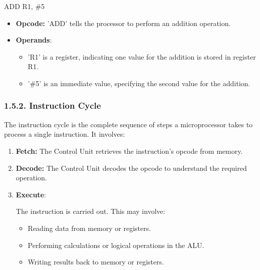 \documentclass[
]{article}
\newenvironment{Shaded}{}{}
\newcommand{\NormalTok}[1]{#1}
\begin{document}
\begin{Shaded}
\begin{Highlighting}[]
\NormalTok{ADD  R1,  \#5}
\end{Highlighting}
\end{Shaded}

\begin{itemize}
\item
  \textbf{Opcode:} 'ADD' tells the processor to perform an addition
  operation.
\item
  \textbf{Operands}:

  \begin{itemize}
  \item
    'R1' is a register, indicating one value for the addition is stored
    in register R1.
  \item
    '\#5' is an immediate value, specifying the second value for the
    addition.
  \end{itemize}
\end{itemize}

\hypertarget{152-instruction-cycle}{%
\subsubsection{1.5.2. Instruction Cycle}\label{152-instruction-cycle}}

The instruction cycle is the complete sequence of steps a microprocessor
takes to process a single instruction. It involves:

\begin{enumerate}
\def\labelenumi{\arabic{enumi}.}
\item
  \textbf{Fetch:} The Control Unit retrieves the instruction's opcode
  from memory.
\item
  \textbf{Decode:} The Control Unit decodes the opcode to understand the
  required operation.
\item
  \textbf{Execute}:

  The instruction is carried out. This may involve:

  \begin{itemize}
  \item
    Reading data from memory or registers.
  \item
    Performing calculations or logical operations in the ALU.
  \item
    Writing results back to memory or registers.
  \end{itemize}
\end{enumerate}
\end{document}
